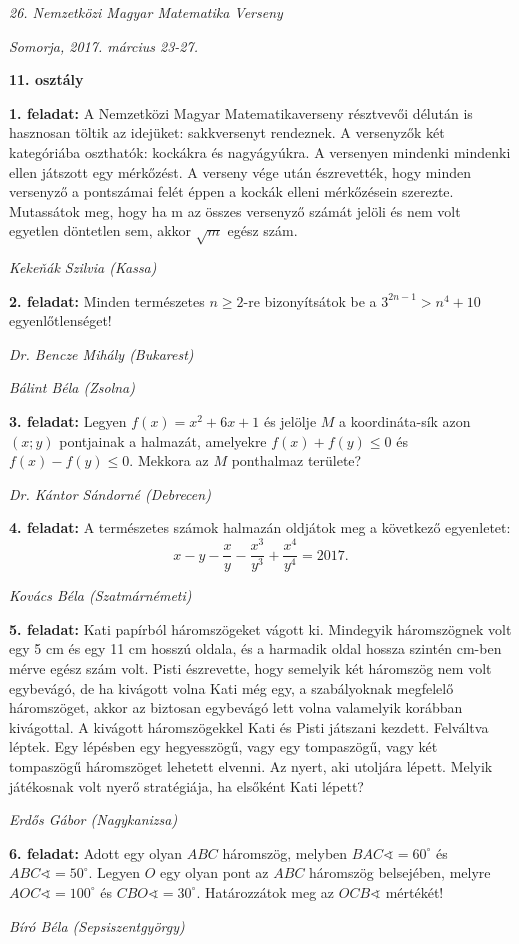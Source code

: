 \documentclass[a4paper,10pt]{article}
\newcommand{\ki}[2]{\hfill {\it #1 (#2)}\medskip}
\begin{document}
\begin{center} \Large {\em 26. Nemzetközi Magyar Matematika Verseny} \end{center}
\begin{center} \large{\em Somorja, 2017. március 23-27.} \end{center}
\smallskip
\begin{center} \large{\bf 11. osztály} \end{center}
\bigskip 

{\bf 1. feladat: } A Nemzetközi Magyar Matematikaverseny résztvevői délután is hasznosan töltik az idejüket: sakkversenyt
rendeznek. A versenyzők két kategóriába oszthatók: kockákra és nagyágyúkra. A versenyen mindenki mindenki
ellen játszott egy mérkőzést. A verseny vége után észrevették, hogy minden versenyző a pontszámai felét éppen
a kockák elleni mérkőzésein szerezte. Mutassátok meg, hogy ha m az összes versenyző számát jelöli és nem
volt egyetlen döntetlen sem, akkor $\sqrt{m}$ egész szám.

\ki{Keke\v{n}ák Szilvia}{Kassa}\medskip

{\bf 2. feladat: } Minden természetes $n\ge 2$-re bizonyítsátok be a $\displaystyle{3^{2n-1}>n^4+10}$ egyenlőtlenséget!

\ki{Dr. Bencze Mihály}{Bukarest}

\ki{Bálint Béla}{Zsolna}\medskip

{\bf 3. feladat: } Legyen 
$f(x)=x^2+6x+1$
és jelölje $M$ a koordináta-sík azon $(x; y)$ pontjainak a halmazát, amelyekre
$f(x)+f(y)\le 0$ és $f(x)-f(y)\le 0$. Mekkora az $M$ ponthalmaz területe?

\ki{Dr. Kántor Sándorné}{Debrecen}\medskip

{\bf 4. feladat: } A természetes számok halmazán oldjátok meg a következő egyenletet: 
$$x-y-\frac{x}{y}-\frac{x^3}{y^3}+\frac{x^4}{y^4}=2017.$$

\ki{Kovács Béla}{Szatmárnémeti}\medskip

{\bf 5. feladat: } Kati papírból háromszögeket vágott ki. Mindegyik háromszögnek volt egy 5 cm és egy 11 cm hosszú oldala, és
a harmadik oldal hossza szintén cm-ben mérve egész szám volt. Pisti észrevette, hogy semelyik két háromszög
nem volt egybevágó, de ha kivágott volna Kati még egy, a szabályoknak megfelelő háromszöget, akkor az
biztosan egybevágó lett volna valamelyik korábban kivágottal. A kivágott háromszögekkel Kati és Pisti játszani
kezdett. Felváltva léptek. Egy lépésben egy hegyesszögű, vagy egy tompaszögű, vagy két tompaszögű
háromszöget lehetett elvenni. Az nyert, aki utoljára lépett. Melyik játékosnak volt nyerő stratégiája, ha elsőként
Kati lépett?

\ki{Erdős Gábor}{Nagykanizsa}\medskip

{\bf 6. feladat: } Adott egy olyan $ABC$ háromszög, melyben $BAC\sphericalangle=60^\circ$
és $ABC\sphericalangle=50^\circ$. 
Legyen $O$ egy olyan pont az $ABC$
háromszög belsejében, melyre 
$AOC\sphericalangle=100^\circ$ és 
$CBO\sphericalangle=30^\circ$. Határozzátok meg az $OCB\sphericalangle$ mértékét!

\ki{Bíró Béla}{Sepsiszentgyörgy}\medskip
\end{document}
